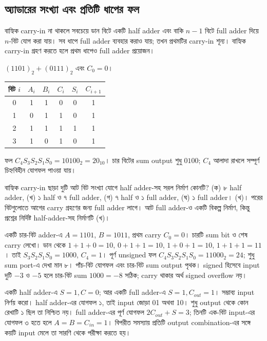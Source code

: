 \subsection{অ্যাডারের সংখ্যা এবং প্রতিটি ধাপের ফল}
বাহ্যিক carry-in না থাকলে সবচেয়ে ডান বিটে একটি half adder এবং বাকি $n-1$ বিটে full adder দিয়ে $n$-বিট যোগ করা যায়। সব ধাপে full adder ব্যবহার করাও যায়; তখন প্রথমটির carry-in শূন্য। বাহ্যিক carry-in গ্রহণ করতে হলে প্রথম ধাপেও full adder প্রয়োজন।

$(1101)_2+(0111)_2$ এবং $C_0=0$।
\begin{center}\begin{tabular}{|c|c|c|c|c|c|}\hline
বিট $i$ & $A_i$ & $B_i$ & $C_i$ & $S_i$ & $C_{i+1}$\\\hline
0&1&1&0&0&1\\\hline
1&0&1&1&0&1\\\hline
2&1&1&1&1&1\\\hline
3&1&0&1&0&1\\\hline
\end{tabular}\end{center}
\chThreeAnswer ফল $C_4S_3S_2S_1S_0=10100_2=20_{10}$। চার বিটের sum output শুধু $0100$; $C_4$ আলাদা রাখলে সম্পূর্ণ চিহ্নবিহীন যোগফল পাওয়া যায়।

বাহ্যিক carry-in ছাড়া দুটি আট বিট সংখ্যা যোগে half adder-সহ সরল নির্মাণ কোনটি? (ক) ৮ half adder, (খ) ১ half ও ৭ full adder, (গ) ৭ half ও ১ full adder, (ঘ) ১ full adder।
\chThreeAnswer (খ)। পরের বিটগুলোতে আগের carry গ্রহণের জন্য full adder লাগে। আট full adder-ও একটি বিকল্প নির্মাণ, কিন্তু প্রশ্নের নির্দিষ্ট half-adder-সহ নির্মাণটি (খ)।

একটি চার-বিট adder-এ $A=1101$, $B=1011$, প্রথম carry $C_0=0$। চারটি sum bit ও শেষ carry লেখো।
\chThreeAnswer ডান থেকে $1+1+0=10$, $0+1+1=10$, $1+0+1=10$, $1+1+1=11$। তাই $S_3S_2S_1S_0=1000$, $C_4=1$। পূর্ণ unsigned ফল $C_4S_3S_2S_1S_0=11000_2=24$; শুধু sum port-এ দেখা মান ৮। পাঁচ-বিট যোগফল এবং চার-বিট sum output পৃথক। signed হিসেবে input দুটি $-3$ ও $-5$ হলে চার-বিট sum $1000=-8$ সঠিক; carry থাকার অর্থ signed overflow নয়।

একটি half adder-এ $S=1,C=0$; আর একটি full adder-এ $S=1,C_{out}=1$। সম্ভাব্য input নির্ণয় করো।
\chThreeAnswer half adder-এর যোগফল ১, তাই input জোড়া 01 অথবা 10। শুধু output থেকে কোন রেখাটি ১ ছিল তা নিশ্চিত নয়। full adder-এর পূর্ণ যোগফল $2C_{out}+S=3$; তিনটি এক-বিট input-এর যোগফল ৩ হতে হলে $A=B=C_{in}=1$। বিপরীত সমস্যায় প্রতিটি output combination-এর সঙ্গে কয়টি input মেলে তা সারণি থেকে পরীক্ষা করতে হয়।
